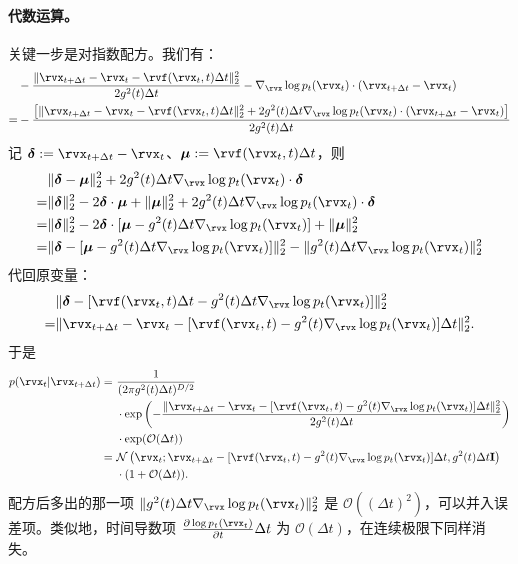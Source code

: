 \paragraph{代数运算。}
关键一步是对指数配方。我们有：
\begin{align*}
    &-\frac{\|\rvx_{t+\Delta t} - \rvx_t - \rvf(\rvx_t, t) \Delta t\|_2^2}{2 g^2(t) \Delta t} - \nabla_{\rvx} \log p_t(\rvx_t) \cdot (\rvx_{t+\Delta t} - \rvx_t) \nonumber \\
    = &-\frac{\left[\|\rvx_{t+\Delta t} - \rvx_t - \rvf(\rvx_t, t) \Delta t\|_2^2 + 2 g^2(t) \Delta t \nabla_{\rvx} \log p_t(\rvx_t) \cdot (\rvx_{t+\Delta t} - \rvx_t)\right]}{2 g^2(t) \Delta t}
\end{align*}
记 $\boldsymbol{\delta} := \rvx_{t+\Delta t} - \rvx_t$、$\boldsymbol{\mu} := \rvf(\rvx_t, t) \Delta t$，则
\begin{align*}
    &\|\boldsymbol{\delta} - \boldsymbol{\mu}\|_2^2 + 2 g^2(t) \Delta t \nabla_{\rvx} \log p_t(\rvx_t) \cdot \boldsymbol{\delta} \nonumber \\
    = &\|\boldsymbol{\delta}\|_2^2 - 2\boldsymbol{\delta} \cdot \boldsymbol{\mu} + \|\boldsymbol{\mu}\|_2^2 + 2 g^2(t) \Delta t \nabla_{\rvx} \log p_t(\rvx_t) \cdot \boldsymbol{\delta} \nonumber \\
    = &\|\boldsymbol{\delta}\|_2^2 - 2\boldsymbol{\delta} \cdot [\boldsymbol{\mu} - g^2(t) \Delta t \nabla_{\rvx} \log p_t(\rvx_t)] + \|\boldsymbol{\mu}\|_2^2 \nonumber \\
    = &\|\boldsymbol{\delta} - [\boldsymbol{\mu} - g^2(t) \Delta t \nabla_{\rvx} \log p_t(\rvx_t)]\|_2^2 - \|g^2(t) \Delta t \nabla_{\rvx} \log p_t(\rvx_t)\|_2^2
\end{align*}
代回原变量：
\begin{align*}
    &\|\boldsymbol{\delta} - [\rvf(\rvx_t, t) \Delta t - g^2(t) \Delta t \nabla_{\rvx} \log p_t(\rvx_t)]\|_2^2 \nonumber \\
    = &\|\rvx_{t+\Delta t} - \rvx_t - [\rvf(\rvx_t, t) - g^2(t) \nabla_{\rvx} \log p_t(\rvx_t)] \Delta t\|_2^2.
\end{align*}
于是
\begin{align*}
    p(\rvx_t | \rvx_{t+\Delta t})
    =~&\frac{1}{(2\pi g^2(t) \Delta t)^{D/2}} \nonumber \\
    \quad &\cdot \exp\left(-\frac{\|\rvx_{t+\Delta t} - \rvx_t - [\rvf(\rvx_t, t) - g^2(t) \nabla_{\rvx} \log p_t(\rvx_t)] \Delta t\|_2^2}{2 g^2(t) \Delta t}\right) \nonumber \\
    \quad &\cdot \exp(\mathcal{O}(\Delta t)) \nonumber \\
    =~&\mathcal{N}\left(\rvx_t; \rvx_{t+\Delta t} - [\rvf(\rvx_t, t) - g^2(t) \nabla_{\rvx} \log p_t(\rvx_t)] \Delta t, g^2(t) \Delta t \mathbf{I}\right) \nonumber \\
    \quad &\cdot (1 + \mathcal{O}(\Delta t)).
\end{align*}
配方后多出的那一项 $\|g^2(t) \Delta t \nabla_{\rvx} \log p_t(\rvx_t)\|_2^2$ 是 $\mathcal{O}((\Delta t)^2)$，可以并入误差项。类似地，时间导数项 $\frac{\partial \log p_t(\rvx_t)}{\partial t} \Delta t$ 为 $\mathcal{O}(\Delta t)$，在连续极限下同样消失。

